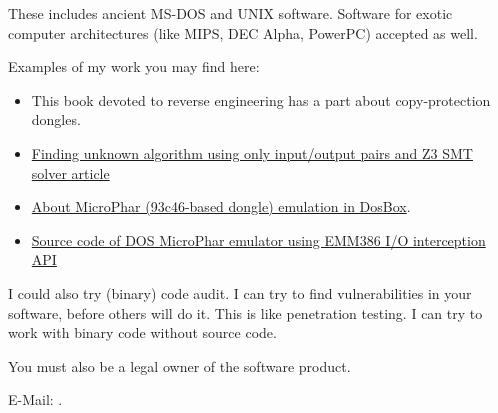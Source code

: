 These includes ancient MS-DOS and UNIX software. Software for exotic computer architectures (like MIPS, DEC Alpha, PowerPC) accepted as well.

Examples of my work you may find here:

\begin{itemize}
\item This book devoted to reverse engineering has a part about copy-protection dongles.
\item \href{http://yurichev.com/writings/z3_rockey.pdf}{Finding unknown algorithm using only input/output pairs and Z3 SMT solver article}
\item \href{http://yurichev.com/blog/56/}{About MicroPhar (93c46-based dongle) emulation in DosBox}.
\item \href{http://conus.info/dongle/src/microph.asm}{Source code of DOS MicroPhar emulator using EMM386 I/O interception API}
\end{itemize}

\bigskip

I could also try (binary) code audit.
I can try to find vulnerabilities in your software, before others will do it.
This is like penetration testing.
I can try to work with binary code without source code.

You must also be a legal owner of the software product.

E-Mail: \GTT{\EMAIL}.

\iffalse
\bigskip

\huge Please donate
\normalsize

\bigskip

\dots to this project so I can continue to work on the book and other articles: \\
\url{https://yurichev.com/donate.html}.

\bigskip
\bigskip
\bigskip

\huge Attention: Opinion Poll
\normalsize

\bigskip
\bigskip
\bigskip

I have an idea to replace all the OllyDbg examples in the book with examples using some other debugger.
I have nothing against OllyDbg, but it has a GUI and uses small fonts, and the screenshots are somewhat unsuitable for the book.

Maybe I could use GDB, rada.re, WinDbg, or maybe some other console debugger?

What do you think about it?
Should I leave OllyDbg examples, or would radare examples would be OK?

E-Mail: \GTT{\EMAIL}.
\fi

\vspace*{\fill}
